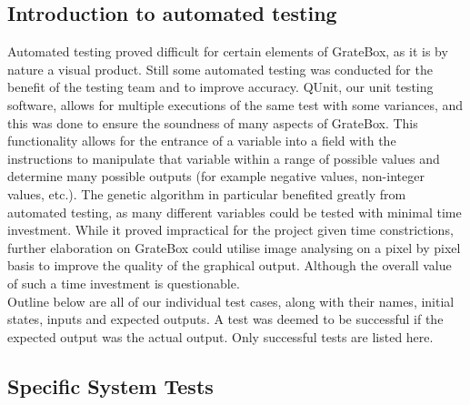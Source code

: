 \documentclass[12pt, titlepage]{article}
\begin{document}
\subsection{Introduction to automated testing}

Automated testing proved difficult for certain elements of GrateBox, as it is 
by nature a visual product. Still some automated testing was conducted for the 
benefit of the testing team and to improve accuracy. QUnit, our unit testing 
software, allows for multiple executions of the same test with some variances, 
and this was done to ensure the soundness of many aspects of GrateBox. This 
functionality allows for the entrance of a variable into a field with the 
instructions to manipulate that variable within a range of possible values and 
determine many possible outputs (for example negative values, non-integer 
values, etc.). The genetic algorithm in particular benefited greatly from 
automated testing, as many different variables could be tested with minimal time 
investment. While it proved impractical for the project given time 
constrictions, further elaboration on GrateBox could utilise image analysing on 
a pixel by pixel basis to improve the quality of the graphical output. Although 
the overall value of such a time investment is questionable.\\

Outline below are all of our individual test cases, along with their names, initial states, inputs and expected outputs. A test was deemed to be successful if the expected output was the actual output. Only successful tests are listed here.

\subsection{Specific System Tests}
\end{document}
